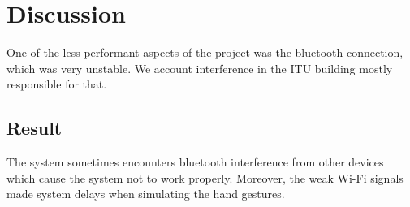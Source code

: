 \section{Discussion}
One of the less performant aspects of the project was the bluetooth connection, which was very unstable. 
We account interference in the ITU building mostly responsible for that. 

\subsection{Result}
The system sometimes encounters bluetooth interference from other devices which
cause the system not to work properly. Moreover, the weak Wi-Fi signals made system delays when simulating the hand gestures. 